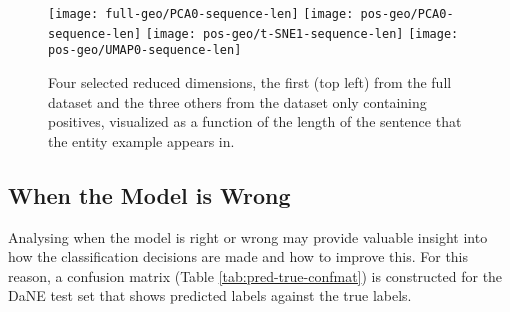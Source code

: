 \documentclass[main.tex]{subfiles}
\begin{document}
\begin{figure}[H]
    \centering
        \texttt{[image: full-geo/PCA0-sequence-len]}
        \texttt{[image: pos-geo/PCA0-sequence-len]}
        \texttt{[image: pos-geo/t-SNE1-sequence-len]}
        \texttt{[image: pos-geo/UMAP0-sequence-len]}
     \caption{
        Four selected reduced dimensions, the first (top left) from the full dataset and the three others from the dataset only containing positives, visualized as a function of the length of the sentence that the entity example appears in.
    }
    \label{fig:repvslen}
\end{figure}\noindent

\subsection{When the Model is Wrong}

Analysing when the model is right or wrong may provide valuable insight into how the classification decisions are made and how to improve this.
For this reason, a confusion matrix (Table \ref{tab:pred-true-confmat}) is constructed for the DaNE test set that shows predicted labels against the true labels\footnotemark.

\end{document}
